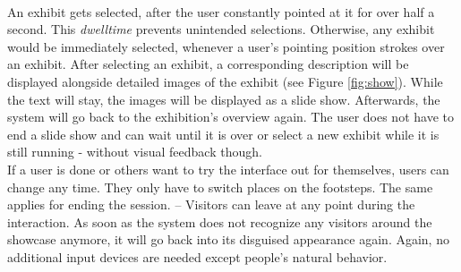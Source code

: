 \\
An exhibit gets selected, after the user constantly pointed at it for over half a second. This \textit{dwelltime} prevents unintended selections. Otherwise, any exhibit would be immediately selected, whenever a user's pointing position strokes over an exhibit. After selecting an exhibit, a corresponding description will be displayed alongside detailed images of the exhibit (see Figure \ref{fig:show}). While the text will stay, the images will be displayed as a slide show. Afterwards, the system will go back to the exhibition's overview again. The user does not have to end a slide show and can wait until it is over or select a new exhibit while it is still running - without visual feedback though.
\\
If a user is done or others want to try the interface out for themselves, users can change any time. They only have to switch places on the footsteps. The same applies for ending the session. -- Visitors can leave at any point during the interaction. As soon as the system does not recognize any visitors around the showcase anymore, it will go back into its disguised appearance again. Again, no additional input devices are needed except people's natural behavior.

